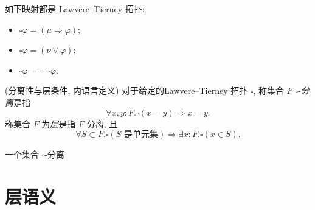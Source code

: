 \begin{example}
	{}
	如下映射都是 Lawvere--Tierney 拓扑:
	\begin{itemize}
		\item $\square\varphi = (\mu\Rightarrow\varphi)$;
		\item $\square\varphi = (\nu\lor\varphi)$;
		\item $\square\varphi = \neg\neg\varphi$.
	\end{itemize}
\end{example}

\begin{definition}
	{(分离性与层条件, 内语言定义)}
	对于给定的Lawvere--Tierney 拓扑 $\square$, 称集合 $F$ $\square$-\emph{分离}是指
	$$
	\forall x,y:F. \square (x=y) \Rightarrow x=y.
	$$
	称集合 $F$ 为\emph{层}是指 $F$ 分离, 且
	$$
	\forall S \subset F. \square (\text{$S$ 是单元集}) \Rightarrow \exists x:F.\square(x\in S).
	$$
\end{definition}

一个集合 $\square$-分离




\section{层语义}















